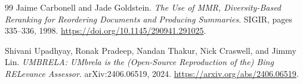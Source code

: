 \documentclass[11pt,letterpaper]{article}
\begin{document}
\begin{thebibliography}{99}
Jaime Carbonell and Jade Goldstein. \emph{The Use of MMR, Diversity-Based Reranking for Reordering Documents and Producing Summaries}. SIGIR, pages 335--336, 1998. \url{https://doi.org/10.1145/290941.291025}.

Shivani Upadhyay, Ronak Pradeep, Nandan Thakur, Nick Craswell, and Jimmy Lin. \emph{UMBRELA: UMbrela is the (Open-Source Reproduction of the) Bing RELevance Assessor}. arXiv:2406.06519, 2024. \url{https://arxiv.org/abs/2406.06519}.

\end{thebibliography}
\endgroup
\end{document}
